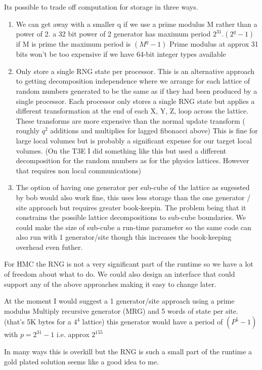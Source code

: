 \documentclass[12pt]{article}
\begin{document}
Its possible to trade off computation for storage in three ways.
\begin{enumerate}
\item We can get away with a smaller q if we use a prime modulus M rather
than a power of 2. a 32 bit power of 2 generator has maximum period $2^31.(2^q - 1)$ 
if M is prime the maximum period is $(M^q -1)$
Prime modulus at approx 31 bits won't be too expensive if we have
64-bit integer types available


\item Only store a single RNG state per processor. This is 
an alternative approach to getting decomposition independence where we
arrange for each lattice of random numbers generated to be the same as 
if they had been produced by a single processor. Each processor only
stores a single RNG state but applies a different transformation at
the end of each X, Y, Z, loop across the lattice. These transforms are
more expensive than the normal update transform ( roughly $q^2$
additions and multiplies for lagged fibonacci above) This is fine for
large local volumes but is probably a significant expense for our
target local volumes.
(On the T3E I did something like this but used a different
decomposition for the random numbers as for the physics
lattices. However that requires non local communications)

\item The option of having one generator per sub-cube of the lattice as
sugessted by bob would also work fine, this uses less storage than the
one generator / site approach but requires greater book-keepin. The
problem being that it constrains the possible lattice decompositions
to sub-cube boundaries. We could make the size of sub-cube a run-time
parameter so the same code can also run with 1 generator/site though
this increases the book-keeping overhead even futher.
\end{enumerate}

For HMC the RNG is not a very significant part of the runtime
so we have a lot of freedom about what to do. We could also design an
interface that could support any of the above approaches making it
easy to change later. 

At the moment I would suggest a 1 generator/site approach using a
prime modulus Multiply recursive generator (MRG) and 5 words of state
per site. (that's 5K bytes for a $4^4$ lattice) this generator would have
a period of $(P^5 - 1)$ with  $p = 2^31-1$  i.e. approx $2^155$

In many ways this is overkill but the RNG is such a small part of the
runtime a gold plated solution seems like a good idea to me.
\end{document}
